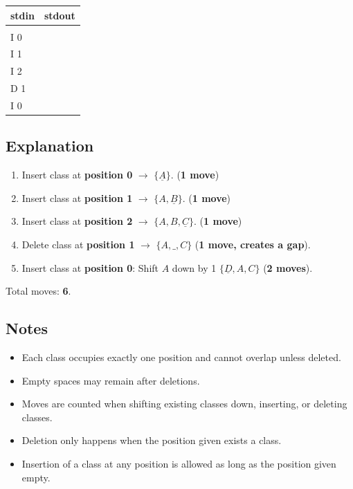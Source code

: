 \documentclass[12pt,a4paper]{article}
\begin{document}
\begin{table}[h]
  \centering
  \begin{tabularx}{\textwidth}{|>{\ttfamily}X|>{\ttfamily}X|}
  \hline
  \textbf{stdin} & \textbf{stdout} \\
  \hline
  5 & 6 \\
  I 0 &  \\
  I 1 & \\
  I 2 & \\
  D 1 &\\
  I 0 & \\
  \hline
 \end{tabularx}
\end{table}

\subsection*{\fontsize{16}{12}Explanation}
\begin{enumerate}
    \item Insert class at \textbf{position 0} $\rightarrow$ \(\{\underline{A}\}\). (\textbf{1 move})
    \item Insert class at \textbf{position 1} $\rightarrow$ \(\{A, \underline{B}\}\). (\textbf{1 move})
    \item Insert class at \textbf{position 2} $\rightarrow$ \(\{A, B, \underline{C}\}\). (\textbf{1 move})
    \item Delete class at \textbf{position 1} $\rightarrow$ \(\{A, \_, C\}\) (\textbf{1 move, creates a gap}).
    \item Insert class at \textbf{position 0}: Shift \( A \) down by 1 \(\{\underline{D}, A, C\}\) (\textbf{2 moves}).
\end{enumerate}
Total moves: \textbf{6}.

\subsection*{\fontsize{16}{12}Notes}
\begin{itemize}
    \item Each class occupies exactly one position and cannot overlap unless deleted.
    \item Empty spaces may remain after deletions.
    \item Moves are counted when shifting existing classes down, inserting, or deleting classes.
    \item Deletion only happens when the position given exists a class.
    \item Insertion of a class at any position is allowed as long as the position given empty.
\end{itemize}
\end{document}

